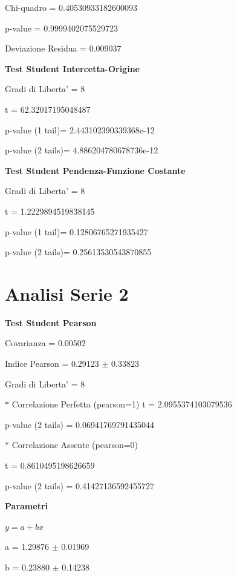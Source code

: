 \documentclass{article}
\begin{document}
Chi-quadro = 0.40530933182600093

p-value = 0.9999402075529723

Deviazione Residua = 0.009037

\textbf{Test Student Intercetta-Origine}

Gradi di Liberta' = 8

t = 62.32017195048487

p-value (1 tail)= 2.443102390339368e-12

p-value (2 tails)= 4.886204780678736e-12

\textbf{Test Student Pendenza-Funzione Costante}

Gradi di Liberta' = 8

t = 1.2229894519838145

p-value (1 tail)= 0.12806765271935427

p-value (2 tails)= 0.25613530543870855

\section*{Analisi Serie 2}

\textbf{Test Student Pearson}

Covarianza = 0.00502

Indice Pearson = 0.29123 $\pm$ 0.33823

Gradi di Liberta' = 8

$\ast$ Correlazione Perfetta (pearson=1)
t = 2.0955374103079536

p-value (2 tails) = 0.06941769791435044

$\ast$ Correlazione Assente (pearson=0)

t = 0.8610495198626659

p-value (2 tails) = 0.41427136592455727

\textbf{Parametri}

$y = a + bx$

a = 1.29876 $\pm$ 0.01969

b = 0.23880 $\pm$ 0.14238
\end{document}
